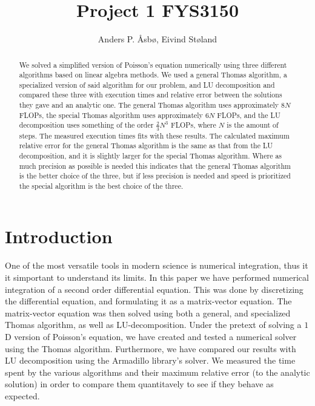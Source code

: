 \documentclass[english,notitlepage,reprint,nofootinbib]{revtex4-1}  %
\begin{document}
\title{Project 1 FYS3150}   %
\author{Anders P. Åsbø, Eivind Støland}               %

\noaffiliation                            %

\begin{abstract}
We solved a simplified version of Poisson's equation numerically using three different algorithms based on linear algebra methods. We used a general Thomas algorithm, a specialized version of said algorithm for our problem, and LU decomposition and compared these three with execution times and relative error between the solutions they gave and an analytic one. The general Thomas algorithm uses approximately $8N$ FLOPs, the special Thomas algorithm uses approximately $6N$ FLOPs, and the LU decomposition uses something of the order $\frac{2}{3}N^3$ FLOPs, where $N$ is the amount of steps. The measured execution times fits with these results. The calculated maximum relative error for the general Thomas algorithm is the same as that from the LU decomposition, and it is slightly larger for the special Thomas algorithm. Where as much precision as possible is needed this indicates that the general Thomas algorithm is the better choice of the three, but if less precision is needed and speed is prioritized the special algorithm is the best choice of the three. 
\end{abstract}
\maketitle



\tableofcontents


\section{Introduction} \label{sec:I}

One of the most versatile tools in modern science is numerical integration, thus it it simportant to understand its limits. In this paper we have performed numerical integration of a second order differential equation. This was done by discretizing the differential equation, and formulating it as a matrix-vector equation. The matrix-vector equation was then solved using both a general, and specialized Thomas algorithm, as well as LU-decomposition. Under the pretext of solving a \(1\)D version of Poisson's equation, we have created and tested a numerical solver using the Thomas algorithm. Furthermore, we have compared our results with LU decomposition using the Armadillo library's solver. We measured the time spent by the various algorithms and their maximum relative error (to the analytic solution) in order to compare them quantitavely to see if they behave as expected.
\end{document}
